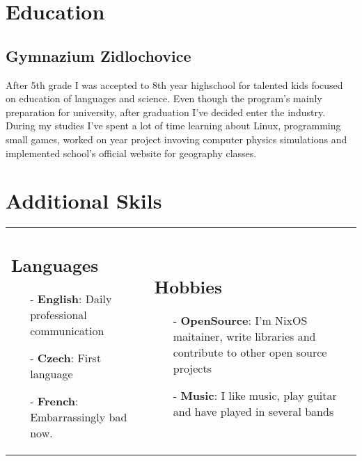 \documentclass[9pt]{article}
\begin{document}
\section{Education}

\subsection{Gymnazium Zidlochovice}

After 5th grade I was accepted to 8th year highschool for talented kids focused on education of languages and science.
Even though the program's mainly preparation for university, after graduation I've decided enter
the industry. During my studies I've spent a lot of time learning about Linux, programming small
games, worked on year project invoving computer physics simulations and implemented school's
official website for geography classes.

\vspace{0.3cm}
\section{Additional Skils}
\vspace{-0.3cm}

\begin{tabular}{@{}ll}
  \begin{minipage}[t]{0.5\textwidth}
      \subsection{Languages}
      \begin{itemize}[leftmargin=0.3cm]
        \item[-] \textbf{English}: Daily professional communication
        \item[-] \textbf{Czech}: First language
        \item[-] \textbf{French}: Embarrassingly bad now.
      \end{itemize}
  \end{minipage}
  & \begin{minipage}[t]{0.5\textwidth}
      \subsection{Hobbies}
      \begin{itemize}[leftmargin=0.3cm]
        \item[-] \textbf{OpenSource}: I'm NixOS maitainer, write libraries and contribute to other open source projects
        \item[-] \textbf{Music}: I like music, play guitar and have played in several bands
      \end{itemize}
  \end{minipage} \\
\end{tabular}
\end{document}
